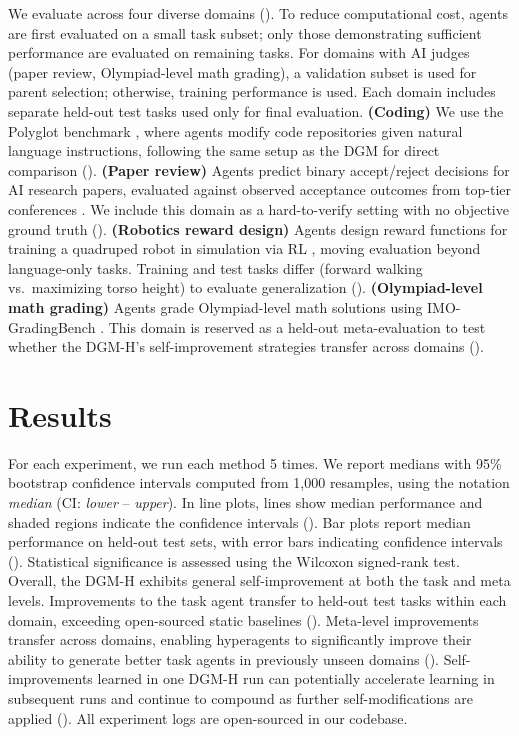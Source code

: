 \documentclass{article}
\begin{document}
We evaluate across four diverse domains (). To reduce computational cost, agents are first evaluated on a small task subset; only those demonstrating sufficient performance are evaluated on remaining tasks. For domains with AI judges (paper review, Olympiad-level math grading), a validation subset is used for parent selection; otherwise, training performance is used. Each domain includes separate held-out test tasks used only for final evaluation.
\textbf{(Coding)} We use the Polyglot benchmark \citep{gauthier2024polyglot}, where agents modify code repositories given natural language instructions, following the same setup as the DGM \citep{zhang2025darwin} for direct comparison ().
\textbf{(Paper review)} Agents predict binary accept/reject decisions for AI research papers, evaluated against observed acceptance outcomes from top-tier conferences \citep{zhao2026apres}. We include this domain as a hard-to-verify setting with no objective ground truth ().
\textbf{(Robotics reward design)} Agents design reward functions for training a quadruped robot in simulation via RL \citep{genesis2024}, moving evaluation beyond language-only tasks. Training and test tasks differ (forward walking vs.\ maximizing torso height) to evaluate generalization ().
\textbf{(Olympiad-level math grading)} Agents grade Olympiad-level math solutions using IMO-GradingBench \citep{luong2025towards}. This domain is reserved as a held-out meta-evaluation to test whether the DGM-H's self-improvement strategies transfer across domains ().

\vspace{-0.5em}
\section{Results}
\label{sec:results}
\vspace{-0.5em}

For each experiment, we run each method 5 times. We report medians with 95\% bootstrap confidence intervals computed from 1,000 resamples, using the notation \textit{median} (CI: \textit{lower} -- \textit{upper}). In line plots, lines show median performance and shaded regions indicate the confidence intervals (). Bar plots report median performance on held-out test sets, with error bars indicating confidence intervals (). Statistical significance is assessed using the Wilcoxon signed-rank test. Overall, the DGM-H exhibits general self-improvement at both the task and meta levels. Improvements to the task agent transfer to held-out test tasks within each domain, exceeding open-sourced static baselines (). Meta-level improvements transfer across domains, enabling hyperagents to significantly improve their ability to generate better task agents in previously unseen domains (). Self-improvements learned in one DGM-H run can potentially accelerate learning in subsequent runs and continue to compound as further self-modifications are applied (). All experiment logs are open-sourced in our codebase.
\end{document}
